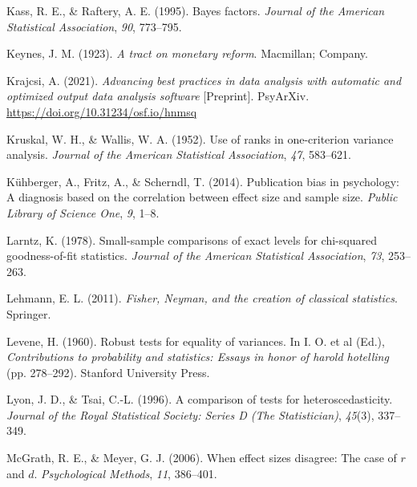 \documentclass[
]{book}
\newlength{\cslhangindent}
\newlength{\cslentryspacingunit} %
\newenvironment{CSLReferences}[2] %
 {%
  \setlength{\parindent}{0pt}
  \ifodd #1
  \let\oldpar\par
  \def\par{\hangindent=\cslhangindent\oldpar}
  \fi
  \setlength{\parskip}{#2\cslentryspacingunit}
 }%
 {}
\theoremstyle{definition}
\theoremstyle{definition}
\theoremstyle{definition}
\theoremstyle{definition}
\theoremstyle{remark}
\begin{document}
\begin{CSLReferences}{1}{0}
\leavevmode{}%
Kass, R. E., \& Raftery, A. E. (1995). Bayes factors. \emph{Journal of the American Statistical Association}, \emph{90}, 773--795.

\leavevmode{}%
Keynes, J. M. (1923). \emph{A tract on monetary reform}. Macmillan; Company.

\leavevmode{}%
Krajcsi, A. (2021). \emph{Advancing best practices in data analysis with automatic and optimized output data analysis software} {[}Preprint{]}. PsyArXiv. \url{https://doi.org/10.31234/osf.io/hnmsq}

\leavevmode{}%
Kruskal, W. H., \& Wallis, W. A. (1952). Use of ranks in one-criterion variance analysis. \emph{Journal of the American Statistical Association}, \emph{47}, 583--621.

\leavevmode{}%
Kühberger, A., Fritz, A., \& Scherndl, T. (2014). Publication bias in psychology: A diagnosis based on the correlation between effect size and sample size. \emph{Public Library of Science One}, \emph{9}, 1--8.

\leavevmode{}%
Larntz, K. (1978). Small-sample comparisons of exact levels for chi-squared goodness-of-fit statistics. \emph{Journal of the American Statistical Association}, \emph{73}, 253--263.

\leavevmode{}%
Lehmann, E. L. (2011). \emph{Fisher, {N}eyman, and the creation of classical statistics}. Springer.

\leavevmode{}%
Levene, H. (1960). Robust tests for equality of variances. In I. O. et al (Ed.), \emph{Contributions to probability and statistics: Essays in honor of harold hotelling} (pp. 278--292). Stanford University Press.

\leavevmode{}%
Lyon, J. D., \& Tsai, C.-L. (1996). A comparison of tests for heteroscedasticity. \emph{Journal of the Royal Statistical Society: Series D (The Statistician)}, \emph{45}(3), 337--349.

\leavevmode{}%
McGrath, R. E., \& Meyer, G. J. (2006). When effect sizes disagree: The case of \(r\) and \(d\). \emph{Psychological Methods}, \emph{11}, 386--401.


\end{CSLReferences}
\end{document}
